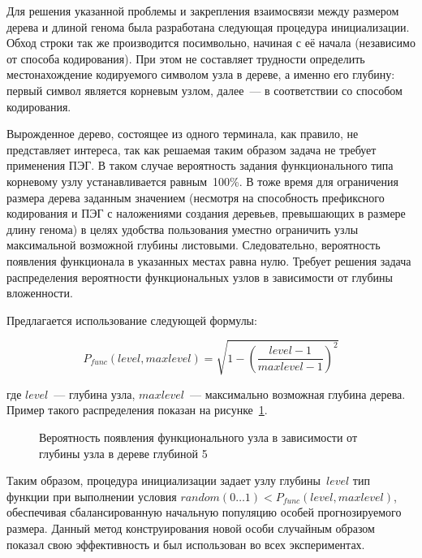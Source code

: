 Для решения указанной проблемы и закрепления взаимосвязи между размером дерева и длиной генома была разработана следующая процедура инициализации. Обход строки так же производится посимвольно, начиная с её начала (независимо от способа кодирования). При этом не составляет трудности определить местонахождение кодируемого символом узла в дереве, а именно его глубину: первый символ является корневым узлом, далее~--- в соответствии со способом кодирования.

Вырожденное дерево, состоящее из одного терминала, как правило, не представляет интереса, так как решаемая таким образом задача не требует применения ПЭГ. В таком случае вероятность задания функционального типа корневому узлу устанавливается равным~100\%. В тоже время для ограничения размера дерева заданным значением (несмотря на способность префиксного кодирования и ПЭГ с наложениями создания деревьев, превышающих в размере длину генома) в целях удобства пользования уместно ограничить узлы максимальной возможной глубины листовыми. Следовательно, вероятность появления функционала в указанных местах равна нулю. Требует решения задача распределения вероятности функциональных узлов в зависимости от глубины вложенности.

Предлагается использование следующей формулы:

\begin{equation}
\label{eq:init_func_prob}
P_{func}(level, maxlevel) = \sqrt{1 - \left(\frac{level - 1}{maxlevel - 1}\right)^2}
\end{equation}

где $level$~--- глубина узла, $maxlevel$~--- максимально возможная глубина дерева. Пример такого распределения показан на рисунке~\ref{img:init_func_prob}.

\begin{figure} [h]
  \center
  \caption{Вероятность появления функционального узла в зависимости от глубины узла в дереве глубиной 5}
  \label{img:init_func_prob}
\end{figure}

Таким образом, процедура инициализации задает узлу глубины~$level$ тип функции при выполнении условия $random(0\ldots1) < P_{func}(level, maxlevel)$, обеспечивая сбалансированную начальную популяцию особей прогнозируемого размера. Данный метод конструирования новой особи случайным образом показал свою эффективность и был использован во всех экспериментах.

